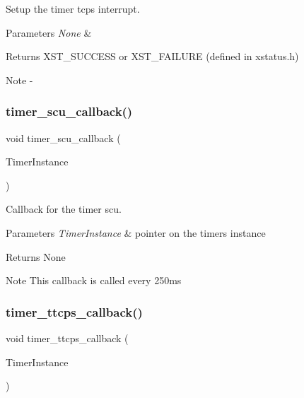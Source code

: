 Setup the timer tcps interrupt. 


\begin{DoxyParams}{Parameters}
{\em None} & \\
\hline
\end{DoxyParams}
\begin{DoxyReturn}{Returns}
X\+S\+T\+\_\+\+S\+U\+C\+C\+E\+SS or X\+S\+T\+\_\+\+F\+A\+I\+L\+U\+RE (defined in xstatus.\+h)
\end{DoxyReturn}
\begin{DoxyNote}{Note}
-\/ 
\end{DoxyNote}
\mbox{\label{interrupt_8c_af39e94c7f4250d6ff6eb2c54aba799d2}} 
\subsubsection{timer\_scu\_callback()}
{\footnotesize\ttfamily void timer\+\_\+scu\+\_\+callback (\begin{DoxyParamCaption}\item[{X\+Scu\+Timer $\ast$}]{Timer\+Instance }\end{DoxyParamCaption})}



Callback for the timer scu. 


\begin{DoxyParams}{Parameters}
{\em Timer\+Instance} & pointer on the timer\textquotesingle{}s instance\\
\hline
\end{DoxyParams}
\begin{DoxyReturn}{Returns}
None
\end{DoxyReturn}
\begin{DoxyNote}{Note}
This callback is called every 250ms 
\end{DoxyNote}
\mbox{\label{interrupt_8c_a504701eac67361c0b616b1607808bea3}} 
\subsubsection{timer\_ttcps\_callback()}
{\footnotesize\ttfamily void timer\+\_\+ttcps\+\_\+callback (\begin{DoxyParamCaption}\item[{X\+Ttc\+Ps $\ast$}]{Timer\+Instance }\end{DoxyParamCaption})}



